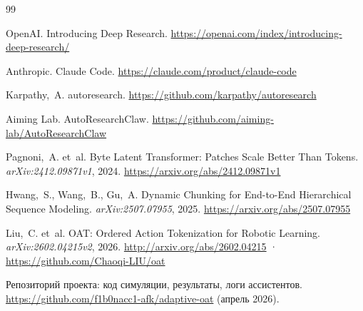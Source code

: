 \documentclass[12pt,a4paper]{article}
\begin{document}
\newpage
\begin{thebibliography}{99}

OpenAI. Introducing Deep Research.
\url{https://openai.com/index/introducing-deep-research/}

Anthropic. Claude Code.
\url{https://claude.com/product/claude-code}

Karpathy,~A. autoresearch.
\url{https://github.com/karpathy/autoresearch}

Aiming Lab. AutoResearchClaw.
\url{https://github.com/aiming-lab/AutoResearchClaw}

Pagnoni,~A. et~al.
Byte Latent Transformer: Patches Scale Better Than Tokens.
\textit{arXiv:2412.09871v1}, 2024.
\url{https://arxiv.org/abs/2412.09871v1}

Hwang,~S., Wang,~B., Gu,~A.
Dynamic Chunking for End-to-End Hierarchical Sequence Modeling.
\textit{arXiv:2507.07955}, 2025.
\url{https://arxiv.org/abs/2507.07955}

Liu,~C. et~al.
OAT: Ordered Action Tokenization for Robotic Learning.
\textit{arXiv:2602.04215v2}, 2026.
\url{http://arxiv.org/abs/2602.04215} ·
\url{https://github.com/Chaoqi-LIU/oat}

Репозиторий проекта: код симуляции, результаты, логи ассистентов.
\url{https://github.com/f1b0nacc1-afk/adaptive-oat} (апрель 2026).

\end{thebibliography}
\end{document}
